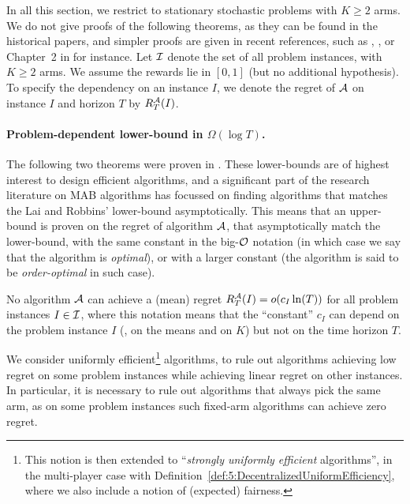 In all this section, we restrict to stationary stochastic problems with $K\geq2$ arms.
We do not give proofs of the following theorems, as they can be found in the historical papers, and simpler proofs are given in recent references, such as \cite{Bubeck12}, \cite{LattimoreBanditAlgorithmsBook}, or Chapter~2 in \cite{Slivkins2019} for instance.
%
Let $\mathcal{I}$ denote the set of all problem instances, with $K \geq 2$ arms. We assume the rewards lie in $[0,1]$ (but no additional hypothesis).
To specify the dependency on an instance $I$, we denote the regret of $\mathcal{A}$ on instance $I$ and horizon $T$ by $R_T^{\mathcal{A}}(I)$.


\paragraph{Problem-dependent lower-bound in $\Omega(\log T)$.}
%
The following two theorems were proven in \cite{LaiRobbins85}.
These lower-bounds are of highest interest to design efficient algorithms,
and a significant part of the research literature on MAB algorithms has focussed on finding algorithms that matches the Lai and Robbins' lower-bound asymptotically.
This means that an upper-bound is proven on the regret of algorithm $\mathcal{A}$, that asymptotically match the lower-bound, with the same constant in the big-$\mathcal{O}$ notation (in which case we say that the algorithm is \emph{optimal}), or with a larger constant (the algorithm is said to be \emph{order-optimal} in such case).


\begin{theorem}\label{thm:2:firstLogTLowerBound}
    No algorithm $\mathcal{A}$ can achieve a (mean) regret $R_T^{\mathcal{A}}(I) = \mathop{}\mathopen{}o\mathopen{}\left(c_I \ln(T)\right)$ for all problem instances $I \in \mathcal{I}$,
    where this notation means that the ``constant'' $c_I$ can depend on the problem instance $I$ (\eg, on the means and on $K$) but not on the time horizon $T$.
\end{theorem}

We consider uniformly efficient\footnote{This notion is then extended to ``\emph{strongly uniformly efficient} algorithms'', in the multi-player case with Definition~\ref{def:5:DecentralizedUniformEfficiency}, where we also include a notion of (expected) fairness.} algorithms, to rule out algorithms achieving low regret on some problem instances while achieving linear regret on other instances.
In particular, it is necessary to rule out algorithms that always pick the same arm, as on some problem instances such fixed-arm algorithms can achieve zero regret.

